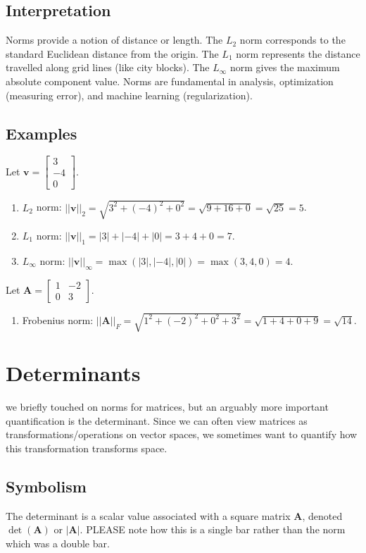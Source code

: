 \documentclass{article}
\newcommand{\vect}[1]{\bm{#1}} %
\newcommand{\mat}[1]{\bm{#1}}  %
\begin{document}
\subsection*{Interpretation}
Norms provide a notion of distance or length. The $L_2$ norm corresponds to the standard Euclidean distance from the origin. The $L_1$ norm represents the distance travelled along grid lines (like city blocks). The $L_\infty$ norm gives the maximum absolute component value. Norms are fundamental in analysis, optimization (measuring error), and machine learning (regularization).

\subsection*{Examples}
Let $\vect{v} = \begin{bmatrix} 3 \\ -4 \\ 0 \end{bmatrix}$.
\begin{enumerate}
    \item $L_2$ norm: $||\vect{v}||_2 = \sqrt{3^2 + (-4)^2 + 0^2} = \sqrt{9 + 16 + 0} = \sqrt{25} = 5$.
    \item $L_1$ norm: $||\vect{v}||_1 = |3| + |-4| + |0| = 3 + 4 + 0 = 7$.
    \item $L_\infty$ norm: $||\vect{v}||_\infty = \max(|3|, |-4|, |0|) = \max(3, 4, 0) = 4$.
\end{enumerate}
Let $\mat{A} = \begin{bmatrix} 1 & -2 \\ 0 & 3 \end{bmatrix}$.
\begin{enumerate}
    \item Frobenius norm: $||\mat{A}||_F = \sqrt{1^2 + (-2)^2 + 0^2 + 3^2} = \sqrt{1 + 4 + 0 + 9} = \sqrt{14}$.
\end{enumerate}

\section{Determinants}
we briefly touched on norms for matrices, but an arguably more important quantification is the determinant. Since we can often view matrices as transformations/operations on vector spaces, we sometimes want to quantify how this transformation transforms space. 

\subsection*{Symbolism}
The determinant is a scalar value associated with a square matrix $\mat{A}$, denoted $\det(\mat{A})$ or $|\mat{A}|$. PLEASE note how this is a single bar rather than the norm which was a double bar.
\end{document}
